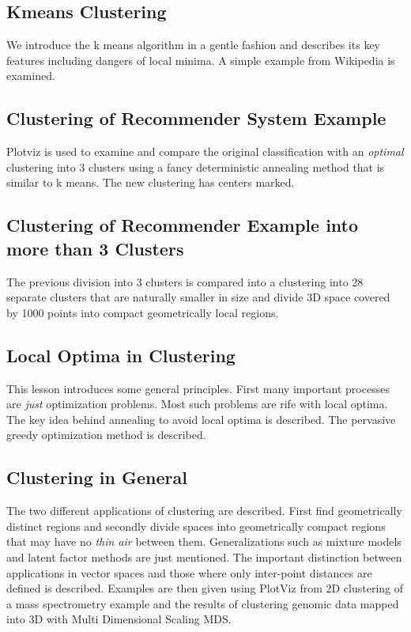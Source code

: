 \subsection{Kmeans Clustering}\label{kmeans-clustering}

We introduce the k means algorithm in a gentle fashion and describes its
key features including dangers of local minima. A simple example from
Wikipedia is examined.

\subsection{Clustering of Recommender System
Example}\label{clustering-of-recommender-system-example}

Plotviz is used to examine and compare the original classification with
an \textit{optimal} clustering into 3 clusters using a fancy deterministic
annealing method that is similar to k means. The new clustering has
centers marked.

\subsection{Clustering of Recommender Example into more than 3
Clusters}\label{clustering-of-recommender-example-into-more-than-3-clusters}

The previous division into 3 clusters is compared into a clustering into
28 separate clusters that are naturally smaller in size and divide 3D
space covered by 1000 points into compact geometrically local regions.

\subsection{Local Optima in
Clustering}\label{local-optima-in-clustering}

This lesson introduces some general principles. First many important
processes are \textit{just} optimization problems. Most such problems are
rife with local optima. The key idea behind annealing to avoid local
optima is described. The pervasive greedy optimization method is
described.

\subsection{Clustering in General}\label{clustering-in-general}

The two different applications of clustering are described. First find
geometrically distinct regions and secondly divide spaces into
geometrically compact regions that may have no \textit{thin air} between
them. Generalizations such as mixture models and latent factor methods
are just mentioned. The important distinction between applications in
vector spaces and those where only inter-point distances are defined is
described. Examples are then given using PlotViz from 2D clustering of a
mass spectrometry example and the results of clustering genomic data
mapped into 3D with Multi Dimensional Scaling MDS.

